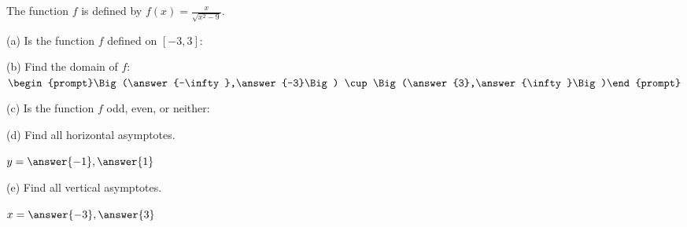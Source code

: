 \documentclass{ximera}
\begin{document}
\begin{exercise}

The function $f$ is defined by $f(x)=\frac{x}{\sqrt{x^2-9}}$.

(a) Is the function $f$ defined on $[-3,3]$:
\begin{prompt}
\begin{multipleChoice}
\end{multipleChoice}
\end{prompt}

(b) Find the domain of $f$: $\begin{prompt}\Big(\answer{-\infty},\answer{-3}\Big) \cup \Big(\answer{3},\answer{\infty}\Big)\end{prompt}$

(c) Is the function $f$ odd, even, or neither:
\begin{prompt}
\begin{multipleChoice}
\end{multipleChoice}
\end{prompt}

(d) Find all horizontal asymptotes. \begin{prompt} $y=\answer{-1},\answer{1}$\end{prompt}

(e) Find all vertical asymptotes. \begin{prompt} $x=\answer{-3},\answer{3}$\end{prompt}
\end{exercise}

\end{document}
